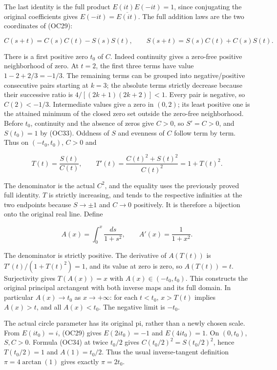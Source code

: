 \documentclass[
  11pt,
]{article}
\begin{document}
The last identity is the full product \(E(it)E(-it)=1\), since
conjugating the original coefficients gives \(E(-it)=\overline{E(it)}\).
The full addition laws are the two coordinates of (OC29):

\[
 C(s+t)=C(s)C(t)-S(s)S(t),\qquad
 S(s+t)=S(s)C(t)+C(s)S(t).
\tag{OC34}
\]

There is a first positive zero \(t_0\) of \(C\). Indeed continuity gives
a zero-free positive neighborhood of zero. At \(t=2\), the first three
terms have value \(1-2+2/3=-1/3\). The remaining terms can be grouped
into negative/positive consecutive pairs starting at \(k=3\); the
absolute terms strictly decrease because their successive ratio is
\(4/[(2k+1)(2k+2)]<1\). Every pair is negative, so \(C(2)<-1/3\).
Intermediate values give a zero in \((0,2)\); its least positive one is
the attained minimum of the closed zero set outside the zero-free
neighborhood. Before \(t_0\), continuity and the absence of zeros give
\(C>0\), so \(S'=C>0\), and \(S(t_0)=1\) by (OC33). Oddness of \(S\) and
evenness of \(C\) follow term by term. Thus on \((-t_0,t_0)\), \(C>0\)
and

\[
 T(t)=\frac{S(t)}{C(t)},\qquad
 T'(t)=\frac{C(t)^2+S(t)^2}{C(t)^2}
       =1+T(t)^2.
\tag{OC35}
\]

The denominator is the actual \(C^2\), and the equality uses the
previously proved full identity. \(T\) is strictly increasing, and tends
to the respective infinities at the two endpoints because \(S\to\pm1\)
and \(C\to0\) positively. It is therefore a bijection onto the original
real line. Define

\[
 A(x)=\int_0^x\frac{ds}{1+s^2},\qquad
 A'(x)=\frac1{1+x^2}.
\tag{OC36}
\]

The denominator is strictly positive. The derivative of \(A(T(t))\) is
\(T'(t)/(1+T(t)^2)=1\), and its value at zero is zero, so \(A(T(t))=t\).
Surjectivity gives \(T(A(x))=x\) with \(A(x)\in(-t_0,t_0)\). This
constructs the original principal arctangent with both inverse maps and
its full domain. In particular \(A(x)\to t_0\) as \(x\to+\infty\): for
each \(t<t_0\), \(x>T(t)\) implies \(A(x)>t\), and all \(A(x)<t_0\). The
negative limit is \(-t_0\).

The actual circle parameter has its original pi, rather than a newly
chosen scale. From \(E(it_0)=i\), (OC29) gives \(E(2it_0)=-1\) and
\(E(4it_0)=1\). On \((0,t_0)\), \(S,C>0\). Formula (OC34) at twice
\(t_0/2\) gives \(C(t_0/2)^2=S(t_0/2)^2\), hence \(T(t_0/2)=1\) and
\(A(1)=t_0/2\). Thus the usual inverse-tangent definition
\(\pi=4\arctan(1)\) gives exactly \(\pi=2t_0\).
\end{document}
